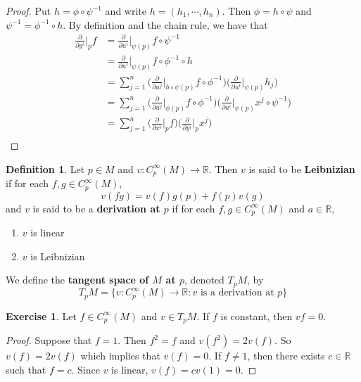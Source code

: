 \documentclass{book}
\theoremstyle{definition}
\newtheorem{defn}[definition]{Definition}
\newtheorem{ex}[definition]{Exercise}
\newcommand{\R}{\mathbb{R}}
\DeclareMathOperator*{\0}{\mbf{0}}
\DeclareMathOperator*{\1}{\mbf{1}}
\newcommand{\tbf}[1]{\textbf{#1}}
\newcommand{\p}{\partial}
\begin{document}
	\begin{proof}
		Put $h = \phi \circ \psi^{-1}$ and write $h = (h_1, \cdots, h_n)$. Then $\phi = h \circ \psi$ and $\psi^{-1} = \phi^{-1} \circ h$. By definition and the chain rule, we have that 
		\begin{align*}
		\frac{\p}{\p y^i} \bigg|_p f 
			&= \frac{\p}{\p u^i} \bigg|_{\psi(p)} f \circ \psi^{-1} \\
			&= \frac{\p}{\p u^i} \bigg|_{\psi(p)} f \circ \phi^{-1} \circ h \\
			&= \sum_{j=1}^n \bigg(\frac{\p}{\p u^j} \bigg|_{h \circ \psi (p)} f \circ \phi^{-1} \bigg)  \bigg( \frac{\p}{\p u^i} \bigg|_{\psi(p)} h_j \bigg) \\
			&= \sum_{j=1}^n \bigg(\frac{\p}{\p u^j} \bigg|_{\phi (p)} f \circ \phi^{-1}  \bigg) \bigg( \frac{\p}{\p u^i} \bigg|_{\psi(p)} x^j \circ \psi^{-1} \bigg) \\
			&= \sum_{j=1}^n \bigg( \frac{\p}{\p x^i} \bigg|_p f \bigg)  \bigg(   \frac{\p}{\p y^i} \bigg|_p x^j  \bigg)\\
		\end{align*}
	\end{proof}

	\begin{defn}
		Let $p \in M$ and $v: C^{\infty}_p(M) \rightarrow \R$. Then $v$ is said to be \tbf{Leibnizian} if for each $f,g \in  C^{\infty}_p(M)$, $$v(fg) = v(f)g(p) + f(p)v(g)$$ and $v$ is said to be a \tbf{derivation at $p$} if for each $f, g \in C^{\infty}_p(M)$ and $a \in \R$,
		\begin{enumerate}
			\item $v$ is linear 
			\item $v$ is Leibnizian
		\end{enumerate}
		We define the \tbf{tangent space of $M$ at $p$}, denoted $T_pM$, by $$T_pM = \{ v: C^{\infty}_p(M) \rightarrow \R: v \text{ is a derivation at }p\}$$
	\end{defn}

	\begin{ex}
		Let $f \in C^{\infty}_p(M)$ and $v \in T_pM$. If $f$ is constant, then $vf = 0$.
	\end{ex}

	\begin{proof}
		Suppose that $f = 1$. Then $f^2 = f$ and $v(f^2) = 2v(f)$. So $v(f) = 2v(f)$ which implies that $v(f) = 0$. If $f \neq 1$, then there exists $c \in \R$ such that $f = c$. Since $v$ is linear, $v(f) = cv(1) = 0$.
	\end{proof}
\end{document}
